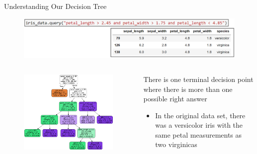 \documentclass[aspectratio=169]{../latex_main/tntbeamer}  %
\begin{document}
	
	\begin{frame}{Understanding Our Decision Tree}
	                \begin{figure}
	                    \includegraphics[scale=.3]{Bild28}
	                \end{figure}
	    \begin{columns}
	        \begin{column}{.4\textwidth}
	                \begin{figure}
	                    \includegraphics[scale=.35]{Bild23}
	                \end{figure}
	        \end{column}
	        
	        
	         \begin{column}{.4\textwidth}
	                There is one terminal decision point where there is more than one possible right answer
	                \begin{itemize}
	                    \item In the original data set, there was a versicolor iris with the same petal measurements as two virginicas
	                \end{itemize}
	        \end{column}
	    \end{columns}
	\end{frame}
	
\end{document}
